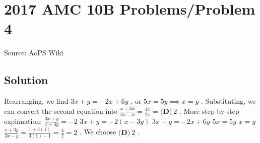 \documentclass[12pt]{article}
\begin{document}
\section*{{2017 AMC 10B Problems/Problem 4}}
Source: AoPS Wiki

\subsection*{Solution}
Rearranging, we find $3x+y=-2x+6y$ , or $5x=5y\implies x=y$ .
Substituting, we can convert the second equation into $\frac{x+3x}{3x-x}=\frac{4x}{2x}=\boxed{\textbf{(D)}\ 2}$ . More step-by-step explanation: $\frac{3x+y}{x-3y}=-2$ $3x+y=-2\left(x-3y\right)$ $3x+y=-2x+6y$ $5x=5y$ $x=y$ $\frac{x+3y}{3x-y}=\frac{1+3\left(1\right)}{3\left(1\right)-1}=\frac{4}{2}=2$ . We choose $\boxed{\textbf{(D)}\ 2}$ .
\end{document}
